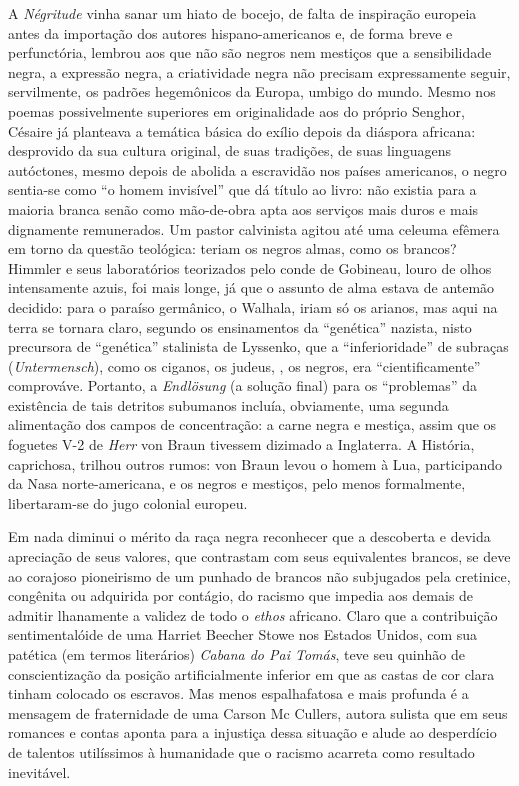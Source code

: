\documentclass[
  letterpaper,
  DIV=11,
  numbers=noendperiod]{scrreprt}
\begin{document}
A \emph{Négritude} vinha sanar um hiato de bocejo, de falta de
inspiração europeia antes da importação dos autores hispano-americanos
e, de forma breve e perfunctória, lembrou aos que não são negros nem
mestiços que a sensibilidade negra, a expressão negra, a criatividade
negra não precisam expressamente seguir, servilmente, os padrões
hegemônicos da Europa, umbigo do mundo. Mesmo nos poemas possivelmente
superiores em originalidade aos do próprio Senghor, Césaire já planteava
a temática básica do exílio depois da diáspora africana: desprovido da
sua cultura original, de suas tradições, de suas linguagens autóctones,
mesmo depois de abolida a escravidão nos países americanos, o negro
sentia-se como ``o homem invisível'' que dá título ao livro: não existia
para a maioria branca senão como mão-de-obra apta aos serviços mais
duros e mais dignamente remunerados. Um pastor calvinista agitou até uma
celeuma efêmera em torno da questão teológica: teriam os negros almas,
como os brancos? Himmler e seus laboratórios teorizados pelo conde de
Gobineau, louro de olhos intensamente azuis, foi mais longe, já que o
assunto de alma estava de antemão decidido: para o paraíso germânico, o
Walhala, iriam só os arianos, mas aqui na terra se tornara claro,
segundo os ensinamentos da ``genética'' nazista, nisto precursora de
``genética'' stalinista de Lyssenko, que a ``inferioridade'' de subraças
(\emph{Untermensch}), como os ciganos, os judeus, , os negros, era
``cientificamente'' comprováve. Portanto, a \emph{Endlösung} (a solução
final) para os ``problemas'' da existência de tais detritos subumanos
incluía, obviamente, uma segunda alimentação dos campos de concentração:
a carne negra e mestiça, assim que os foguetes V-2 de \emph{Herr} von
Braun tivessem dizimado a Inglaterra. A História, caprichosa, trilhou
outros rumos: von Braun levou o homem à Lua, participando da Nasa
norte-americana, e os negros e mestiços, pelo menos formalmente,
libertaram-se do jugo colonial europeu.

Em nada diminui o mérito da raça negra reconhecer que a descoberta e
devida apreciação de seus valores, que contrastam com seus equivalentes
brancos, se deve ao corajoso pioneirismo de um punhado de brancos não
subjugados pela cretinice, congênita ou adquirida por contágio, do
racismo que impedia aos demais de admitir lhanamente a validez de todo o
\emph{ethos} africano. Claro que a contribuição sentimentalóide de uma
Harriet Beecher Stowe nos Estados Unidos, com sua patética (em termos
literários) \emph{Cabana do Pai Tomás}, teve seu quinhão de
conscientização da posição artificialmente inferior em que as castas de
cor clara tinham colocado os escravos. Mas menos espalhafatosa e mais
profunda é a mensagem de fraternidade de uma Carson Mc Cullers, autora
sulista que em seus romances e contas aponta para a injustiça dessa
situação e alude ao desperdício de talentos utilíssimos à humanidade que
o racismo acarreta como resultado inevitável.
\end{document}
